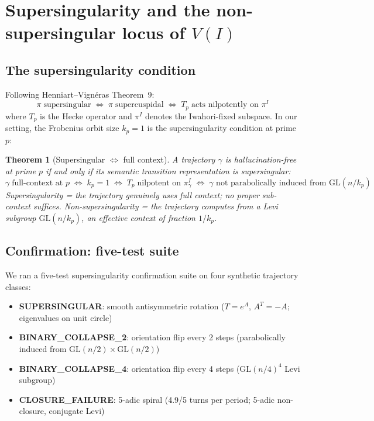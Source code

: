 \documentclass[11pt]{amsart}
\newtheorem{theorem}{Theorem}[section]
\theoremstyle{definition}
\begin{document}
\section{Supersingularity and the non-supersingular locus of $V(I)$}
\label{sec:supersingularity}

\subsection{The supersingularity condition}

Following Henniart--Vign\'{e}ras \cite{HV17} Theorem~9:
\[
  \pi \;\text{supersingular}
  \;\iff\;
  \pi \;\text{supercuspidal}
  \;\iff\;
  T_p \;\text{acts nilpotently on } \pi^I
\]
where $T_p$ is the Hecke operator and $\pi^I$ denotes the
Iwahori-fixed subspace.
In our setting, the Frobenius orbit size $k_p = 1$ is the
supersingularity condition at prime $p$:

\begin{theorem}[Supersingular $\iff$ full context]
\label{thm:supersingular}
A trajectory $\gamma$ is hallucination-free at prime $p$ if and only
if its semantic transition representation is supersingular:
\[
  \gamma \;\text{full-context at }p
  \;\iff\;
  k_p = 1
  \;\iff\;
  T_p \;\text{nilpotent on }\pi^I_\gamma
  \;\iff\;
  \gamma \text{ not parabolically induced from } \mathrm{GL}(n/k_p)
\]
Supersingularity = the trajectory genuinely uses full context;
no proper sub-context suffices.
Non-supersingularity = the trajectory computes from a Levi subgroup
$\mathrm{GL}(n/k_p)$, an effective context of fraction $1/k_p$.
\end{theorem}

\subsection{Confirmation: five-test suite}

We ran a five-test supersingularity confirmation suite on four
synthetic trajectory classes:
\begin{itemize}
  \item \textbf{SUPERSINGULAR}: smooth antisymmetric rotation
    ($T = e^A$, $A^T = -A$; eigenvalues on unit circle)
  \item \textbf{BINARY\_COLLAPSE\_2}: orientation flip every 2 steps
    (parabolically induced from $\mathrm{GL}(n/2) \times \mathrm{GL}(n/2)$)
  \item \textbf{BINARY\_COLLAPSE\_4}: orientation flip every 4 steps
    ($\mathrm{GL}(n/4)^4$ Levi subgroup)
  \item \textbf{CLOSURE\_FAILURE}: 5-adic spiral (4.9/5 turns per period;
    5-adic non-closure, conjugate Levi)
\end{itemize}
\end{document}
